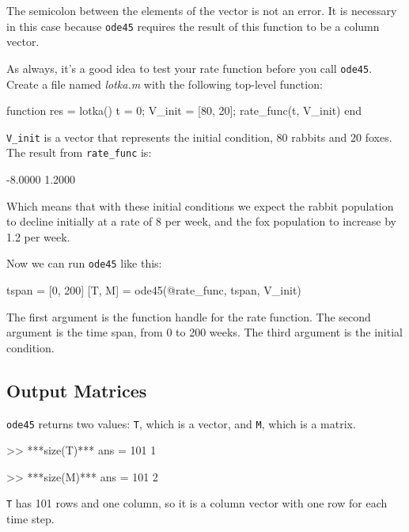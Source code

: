 The semicolon between the elements of the vector is not an error.  It
is necessary in this case because \lstinline{ode45} requires the result of
this function to be a column vector.


As always, it's a good idea to test your rate function before you call \lstinline{ode45}.  
Create a file named {\em lotka.m} with the following top-level function:

\begin{code}
function res = lotka()
    t = 0;
    V_init = [80, 20];
    rate_func(t, V_init)
end
\end{code}


\lstinline{V_init} is a vector that represents the initial condition, 80 rabbits and 20 foxes.  
The result from \lstinline{rate_func} is:

\begin{code}
-8.0000
 1.2000
 \end{code}
Which means that with these initial conditions we expect the rabbit population to decline initially at a rate of 8 per week, and the fox population to increase by 1.2 per week.  
  
Now we can run \lstinline{ode45} like this:

\begin{code}
tspan = [0, 200]
[T, M] = ode45(@rate_func, tspan, V_init)
\end{code}

The first argument is the function handle for the rate function.
The second argument is the time span, from 0 to 200 weeks.
The third argument is the initial condition.



\subsection{Output Matrices}

\lstinline{ode45} returns two values: \lstinline{T}, which is a vector, 
and \lstinline{M}, which is a matrix.

\begin{code}
>> ***size(T)***
ans = 101     1

>> ***size(M)***
ans = 101     2
\end{code}

\lstinline{T} has 101 rows and one column, so it is a column vector with one row for
each time step.

